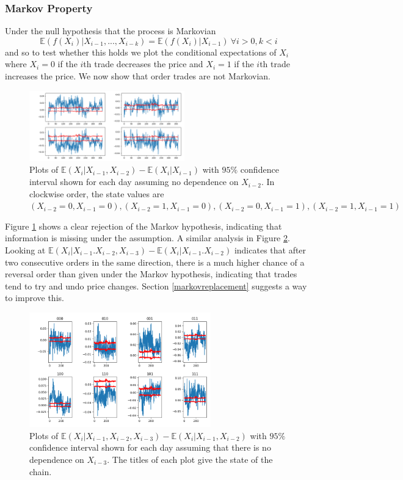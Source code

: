 \documentclass[a4paper,10pt]{article}
\begin{document}
\subsubsection{Markov Property}
Under the null hypothesis that the process is Markovian 
\begin{equation}
\mathbb{E}\left(f(X_i) | X_{i-1}, ... ,X_{i - k}\right) = \mathbb{E}\left(f(X_i) | X_{i-1}\right) \ \forall i > 0, k < i
\end{equation}
and so to test whether this holds we plot the conditional expectations of $X_i$ where $X_i = 0$ if the $i$th trade decreases the price and $X_i = 1$ if the $i$th trade increases the price. We now show that order trades are not Markovian.  
\begin{figure}[h]
    \centering
    \includegraphics[width=0.6\textwidth]{images/markov95}
    \caption{Plots of $\mathbb{E}(X_i | X_{i-1}, X_{i-2}) - \mathbb{E}(X_i | X_{i-1})$ with $95\%$ confidence interval shown for each day assuming no dependence on $X_{i - 2}$. In clockwise order, the state values are $(X_{i - 2} = 0, X_{i - 1} = 0), (X_{i - 2} = 1, X_{i - 1} = 0), (X_{i - 2} = 0, X_{i - 1} = 1), (X_{i - 2} = 1, X_{i - 1} = 1)$}
    \label{CI95markov}
\end{figure}
Figure \ref{CI95markov} shows a clear rejection of the Markov hypothesis, indicating that information is missing under the assumption. A similar analysis in Figure \ref{CI952ndordermarkov}. Looking at $\mathbb{E}(X_i | X_{i-1}. X_{i - 2}, X_{i-3}) - \mathbb{E}(X_i | X_{i-1}. X_{i - 2})$ indicates that after two consecutive orders in the same direction, there is a much higher chance of a reversal order than given under the Markov hypothesis, indicating that trades tend to try and undo price changes. Section \ref{markovreplacement} suggests a way to improve this.
\begin{figure}[h]
    \centering
    \includegraphics[width=0.7\textwidth]{images/2ndordermarkov}
    \caption{Plots of $\mathbb{E}(X_i | X_{i-1}, X_{i-2}, X_{i-3}) - \mathbb{E}(X_i | X_{i-1}, X_{i - 2})$ with $95\%$ confidence interval shown for each day assuming that there is no dependence on $X_{i-3}$. The titles of each plot give the state of the chain.}
    \label{CI952ndordermarkov}
\end{figure}
\end{document}

